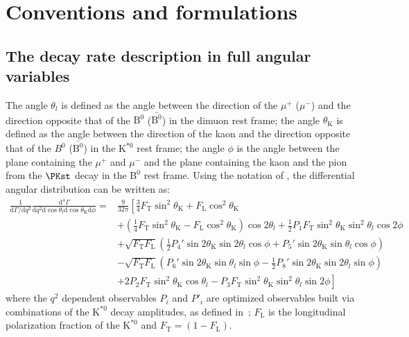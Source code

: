 \section{Conventions and formulations}
\label{sec:formula}

\subsection{The decay rate description in full angular variables}
\label{sec:fullform}

The angle $\theta_l$ is defined as the angle between the
direction of the $\mu^+ $ ($\mu^- $) and the direction opposite that of
the $\text{B}^0$ ($\bar{\text{B}^0}$) in the dimuon rest frame; the
angle $\theta_\mathrm{K} $ is defined as the angle between the direction of the
kaon and the direction opposite that of the $B^0$
($\bar{\text{B}^0}$) in the $\text{K}^{*0}$ rest frame; the angle
$\phi$ is the angle between the plane containing the $\mu^+ $ and
$\mu^- $ and the plane containing the kaon and the pion from the
$\PKst$ decay in the $\text{B}^0$ rest frame.  Using the notation of
\cite{Ball2009}, the differential angular distribution can be written
as:
\begin{equation} \label{eq:Angular}
    \begin{split}
        \frac{1}{\mathrm{d}\Gamma/\mathrm{d}q^2}\frac{\mathrm{d}^4\Gamma}{\mathrm{d}q^2 \mathrm{d}\cos\theta_l \mathrm{d}\cos\theta_\mathrm{K} \mathrm{d}\phi} =&\frac{9}{32\pi}\left[\frac{3}{4}F_\mathrm{T}\sin^2\theta_\mathrm{K} + F_\mathrm{L}\cos^2\theta_\mathrm{K} \right.\\
            &\left.+\left(\frac{1}{4}F_\mathrm{T}\sin^2\theta_\mathrm{K}-F_\mathrm{L}\cos^2\theta_\mathrm{K}\right)\cos2\theta_l+\frac{1}{2}P_1F_\mathrm{T}\sin^2\theta_\mathrm{K}\sin^2\theta_l\cos 2\phi \right.\\
            &+\sqrt{F_\mathrm{T}F_\mathrm{L}}\left(\frac{1}{2}P_4'\sin2\theta_\mathrm{K}\sin2\theta_l\cos\phi+P_5'\sin2\theta_\mathrm{K}\sin\theta_l\cos\phi \right)\\
            &-\sqrt{F_\mathrm{T}F_\mathrm{L}}\left(P_6'\sin2\theta_\mathrm{K}\sin\theta_l\sin\phi-\frac{1}{2}P_8'\sin2\theta_\mathrm{K}\sin2\theta_l\sin\phi \right)\\
            &\left.+2P_2F_\mathrm{T}\sin^2\theta_\mathrm{K}\cos\theta_l-P_3F_\mathrm{T}\sin^2\theta_\mathrm{K}\sin^2\theta_l\sin2\phi \right]
    \end{split}
\end{equation}
where the $q^2$ dependent observables $P_i$ and $P'_i$ are optimized observables built via 
combinations of the $\text{K}^{*0}$ decay amplitudes, as defined in~\cite{Genon:Swave};
$F_\mathrm{L}$ is the longitudinal polarization fraction of the $\text{K}^{*0}$ and
$F_\mathrm{T}=(1-F_\mathrm{L})$.

